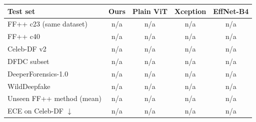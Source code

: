 \begin{tabular}{lcccc}
\toprule
Test set & Ours & Plain ViT & Xception & EffNet-B4 \\
\midrule
FF++ c23 (same dataset) & n/a & n/a & n/a & n/a \\
FF++ c40 & n/a & n/a & n/a & n/a \\
Celeb-DF v2 & n/a & n/a & n/a & n/a \\
DFDC subset & n/a & n/a & n/a & n/a \\
DeeperForensics-1.0 & n/a & n/a & n/a & n/a \\
WildDeepfake & n/a & n/a & n/a & n/a \\
\midrule
Unseen FF++ method (mean) & n/a & n/a & n/a & n/a \\
ECE on Celeb-DF $\downarrow$ & n/a & n/a & n/a & n/a \\
\bottomrule
\end{tabular}
